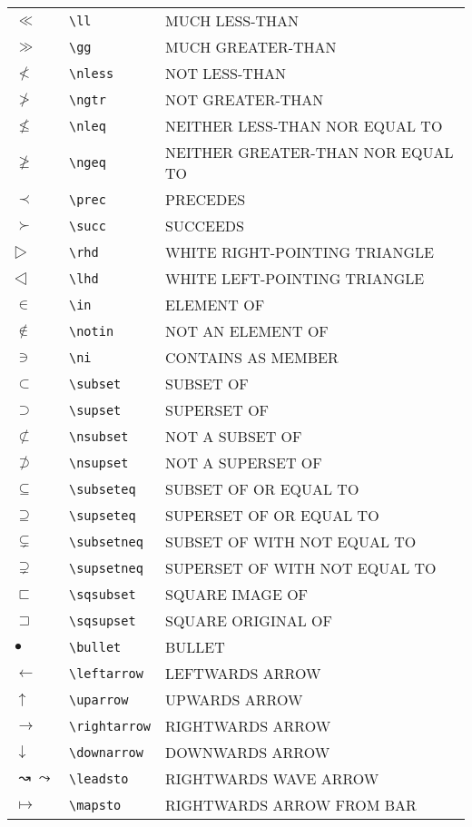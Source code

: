\begin{center}
\begin{xtabular}{|ll>{\smaller\ttfamily}l|}
  $≪$ & \verb|\ll| & MUCH LESS-THAN \\
  $≫$ & \verb|\gg| & MUCH GREATER-THAN \\
  $≮$ & \verb|\nless| & NOT LESS-THAN \\
  $≯$ & \verb|\ngtr| & NOT GREATER-THAN \\
  $≰$ & \verb|\nleq| & NEITHER LESS-THAN NOR EQUAL TO \\
  $≱$ & \verb|\ngeq| & NEITHER GREATER-THAN NOR EQUAL TO \\
  $≺$ & \verb|\prec| & PRECEDES \\
  $≻$ & \verb|\succ| & SUCCEEDS \\
  $▷$ & \verb|\rhd| & WHITE RIGHT-POINTING TRIANGLE \\
  $◁$ & \verb|\lhd| & WHITE LEFT-POINTING TRIANGLE \\
  $∈$ & \verb|\in| & ELEMENT OF \\
  $∉$ & \verb|\notin| & NOT AN ELEMENT OF \\
  $∋$ & \verb|\ni| & CONTAINS AS MEMBER \\
  $⊂$ & \verb|\subset| & SUBSET OF \\
  $⊃$ & \verb|\supset| & SUPERSET OF \\
  $⊄$ & \verb|\nsubset| & NOT A SUBSET OF \\
  $⊅$ & \verb|\nsupset| & NOT A SUPERSET OF \\
  $⊆$ & \verb|\subseteq| & SUBSET OF OR EQUAL TO \\
  $⊇$ & \verb|\supseteq| & SUPERSET OF OR EQUAL TO \\
  $⊊$ & \verb|\subsetneq| & SUBSET OF WITH NOT EQUAL TO \\
  $⊋$ & \verb|\supsetneq| & SUPERSET OF WITH NOT EQUAL TO \\
  $⊏$ & \verb|\sqsubset| & SQUARE IMAGE OF \\
  $⊐$ & \verb|\sqsupset| & SQUARE ORIGINAL OF \\
  $•$ & \verb|\bullet| & BULLET \\
  $←$ & \verb|\leftarrow| & LEFTWARDS ARROW \\
  $↑$ & \verb|\uparrow| & UPWARDS ARROW \\
  $→$ & \verb|\rightarrow| & RIGHTWARDS ARROW \\
  $↓$ & \verb|\downarrow| & DOWNWARDS ARROW \\
  $↝\leadsto$ & \verb|\leadsto| & RIGHTWARDS WAVE ARROW \\
  $↦$ & \verb|\mapsto| & RIGHTWARDS ARROW FROM BAR \\

\end{xtabular}
\end{center}
